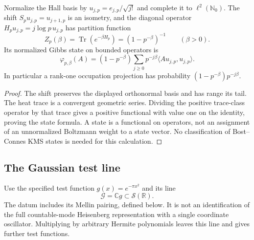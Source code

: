 \begin{proposition}
\label{v4-arith:prim-zeta:prop:BC-ergodic}
Normalize the Hall basis by \(u_{j,p}=e_{j,p}/\sqrt{j!}\) and complete
it to \(\ell^2(\mathbb N_0)\). The shift
\(S_pu_{j,p}=u_{j+1,p}\) is an isometry, and the diagonal operator
\(H_pu_{j,p}=j\log p\,u_{j,p}\) has partition function
\[
 Z_p(\beta)=\operatorname{Tr}(e^{-\beta H_p})
            =(1-p^{-\beta})^{-1}\qquad(\beta>0).
\]
Its normalized Gibbs state on bounded operators is
\[
 \varphi_{p,\beta}(A)=(1-p^{-\beta})
 \sum_{j\ge0}p^{-j\beta}\langle Au_{j,p},u_{j,p}\rangle.
\]
In particular a rank-one occupation projection has probability
\((1-p^{-\beta})p^{-j\beta}\).
\end{proposition}
\begin{proof}
The shift preserves the displayed orthonormal basis and has range its
tail. The heat trace is a convergent geometric series. Dividing the
positive trace-class operator by that trace gives a positive functional
with value one on the identity, proving the state formula.
A state is a functional on operators, not an assignment of an
unnormalized Boltzmann weight to a state vector. No classification of
Bost--Connes KMS states is needed for this calculation.
\end{proof}

\subsection{The Gaussian test line}
\label{v4-arith:prim-zeta:archimedean-primary}
\begin{definition}
\label{v4-arith:prim-zeta:def:arch-primary}
Use the specified test function \(g(x)=e^{-\pi x^2}\) and its line
\begin{equation}
\label{v4-arith:prim-zeta:eq:arch-primary}
 \mathcal G=\mathbb Cg\subset\mathcal S(\mathbb R).
\end{equation}
The datum includes its Mellin pairing, defined below. It is not an
identification of the full countable-mode Heisenberg representation
with a single coordinate oscillator. Multiplying by arbitrary Hermite
polynomials leaves this line and gives further test functions.
\end{definition}


